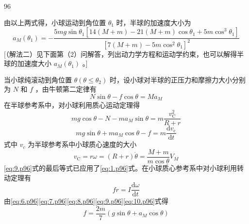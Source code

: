 \begin{solution}{96}
\begin{subsolution}
\begin{equation*}
        \end{equation*}
        由以上两式得，小球运动到角位置 $\theta_{1}$ 时，半球的加速度大小为
        \begin{equation}
            a _ {M} \left(\theta_ {1}\right) = - \frac {5 m g \sin \theta_ {1} \left[ 1 4 (M + m) - 2 1 (M + m) \cos \theta_ {1} + 5 m \cos^ {3} \theta_ {1} \right]}{\left[ 7 (M + m) - 5 m \cos^ {2} \theta_ {1} \right] ^ {2}}
            \label{eq:5.p96}
        \end{equation}
        [（解法二）见下面第（2）问解答，列出动力学方程和运动学约束，也可以解得半球的加速度大小 $a_{M}(\theta_{1})$ 。]
    \end{subsolution}
    \begin{subsolution}
        当小球纯滚动到角位置 $\theta (\theta \leq \theta_{2})$ 时，设小球对半球的正压力和摩擦力大小分别为 $N$ 和 $f$ ，由牛顿第二定律有
        \begin{equation}
            N \sin \theta - f \cos \theta = M a _ {M}
            \label{eq:6.p96}
        \end{equation}
        在半球参考系中，对小球利用质心运动定理得
        \begin{equation}
            m g \cos \theta - N - m a _ {M} \sin \theta = m \frac {v _ {\mathrm{C}} ^ {2}}{R + r}
            \label{eq:7.p96}
        \end{equation}
        \begin{equation}
            m g \sin \theta + m a _ {M} \cos \theta - f = m \frac {\mathrm{d} v _ {\mathrm{c}}}{\mathrm{d} t}
            \label{eq:8.p96}
        \end{equation}
        式中 $v_{c}$ 为半球参考系中小球质心速度的大小
        \begin{equation}
            v _ {\mathrm{C}} = r \omega = (R + r) \dot {\theta} = \frac {M + m}{m \cos \theta} V _ {M}
            \label{eq:9.p96}
        \end{equation}
        \eqref{eq:9.p96}式的最后等式已应用了\eqref{eq:1.p96}式。在小球质心参考系中对小球利用转动定理有
        \begin{equation}
            f r = I \frac {\mathrm{d} \omega}{\mathrm{d} t}
            \label{eq:10.p96}
        \end{equation}
        由\eqref{eq:6.p96}\eqref{eq:7.p96}\eqref{eq:8.p96}\eqref{eq:9.p96}\eqref{eq:10.p96}式得
        \begin{equation}
            f = \frac {2 m}{7} \left(g \sin \theta + a _ {M} \cos \theta\right)
            \label{eq:11.p96}
        \end{equation}

\end{subsolution}
\end{solution}
